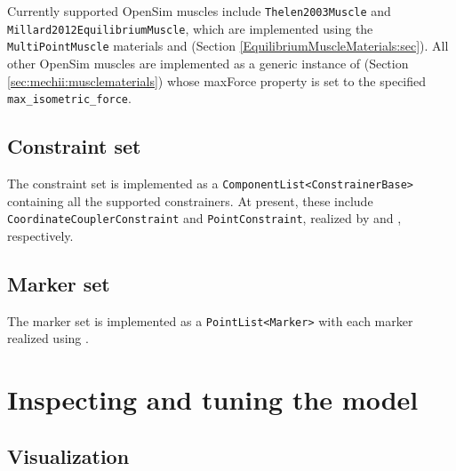 Currently supported OpenSim muscles include {\tt Thelen2003Muscle} and {\tt
Millard2012EquilibriumMuscle}, which are implemented using the {\tt
MultiPointMuscle} materials
 and 
(Section \ref{EquilibriumMuscleMaterials:sec}).
All other OpenSim muscles are implemented as a generic
instance of
(Section \ref{sec:mechii:musclematerials}) whose {\sf maxForce} property is set
to the specified {\tt max\_isometric\_force}.

\subsection{Constraint set}

The constraint set is implemented as a {\tt ComponentList<ConstrainerBase>}
containing all the supported constrainers. At present, these include {\tt
CoordinateCouplerConstraint} and {\tt PointConstraint}, realized by
 and
, respectively.

\subsection{Marker set}

The marker set is implemented as a {\tt PointList<Marker>} with each marker
realized using .

\section{Inspecting and tuning the model}
\label{inspectingAndTuning:sec}

\subsection{Visualization}


